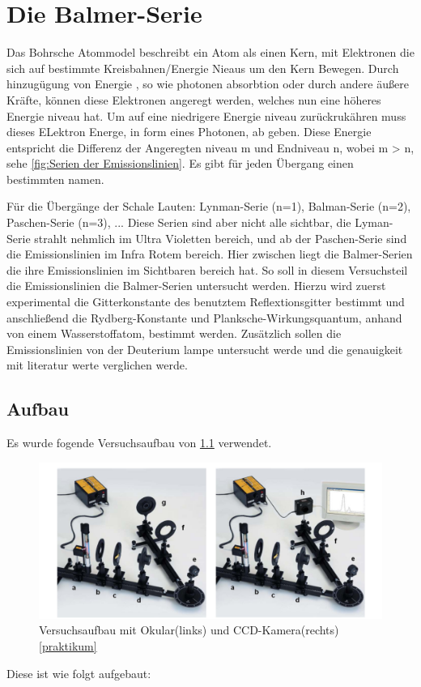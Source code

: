 \chapter{Die Balmer-Serie}

Das Bohrsche Atommodel beschreibt ein Atom als einen Kern, mit Elektronen die sich auf bestimmte Kreisbahnen/Energie Nieaus um den Kern Bewegen.
Durch hinzugügung von Energie , so wie photonen absorbtion oder durch andere äußere Kräfte, können diese Elektronen angeregt werden, welches nun eine höheres Energie niveau hat. 
Um auf eine niedrigere Energie niveau zurückrukähren muss dieses ELektron Energe, in form eines Photonen, ab geben. 
Diese Energie entspricht die Differenz der Angeregten niveau m und Endniveau n, wobei m > n, sehe \cref{fig:Serien der Emissionslinien}. 
Es gibt für jeden Übergang einen bestimmten namen. 


Für die Übergänge der Schale Lauten: Lynman-Serie (n=1), Balman-Serie (n=2), Paschen-Serie (n=3), ...
Diese Serien sind aber nicht alle sichtbar, die Lyman-Serie strahlt nehmlich im Ultra Violetten bereich, und ab der Paschen-Serie sind die Emissionslinien im Infra Rotem bereich.
Hier zwischen liegt die Balmer-Serien die ihre Emissionslinien im Sichtbaren bereich hat.
So soll in diesem Versuchsteil die Emissionslinien die Balmer-Serien untersucht werden. 
Hierzu wird zuerst experimental die Gitterkonstante des benutztem Reflextionsgitter bestimmt und anschließend die Rydberg-Konstante und Planksche-Wirkungsquantum, anhand von einem Wasserstoffatom, bestimmt werden.
Zusätzlich sollen die Emissionslinien von der Deuterium lampe untersucht werde und die genauigkeit mit literatur werte verglichen werde.


\section{Aufbau}

Es wurde fogende Versuchsaufbau von \cref{fig:balmeraufbau} verwendet. 

\begin{figure}[htbp]
    \centering
    \includegraphics[width=0.7\linewidth]{figs/aufbau_balmer_serie.png}
    \caption{Versuchsaufbau mit Okular(links) und CCD-Kamera(rechts) \ref{praktikum}}
    \label{fig:balmeraufbau}
\end{figure}
Diese ist wie folgt aufgebaut: 

